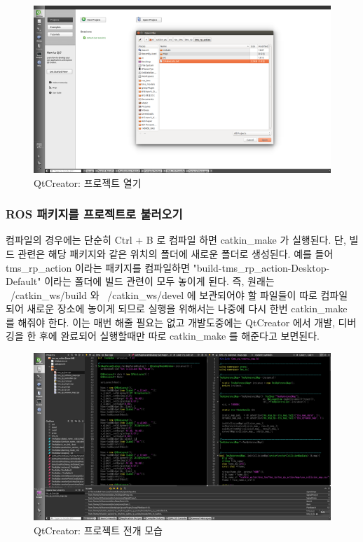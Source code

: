 \begin{figure}[h]
\centering\includegraphics[width=0.8\columnwidth]{pictures/chapter2/qtcreator2.png}
\caption{QtCreator: 프로젝트 열기}
\end{figure}

\subsubsection{ROS 패키지를 프로젝트로 불러오기}
컴파일의 경우에는 단순히 Ctrl + B 로 컴파일 하면 catkin\_make 가 실행된다. 단, 빌드 관련은 해당 패키지와 같은 위치의 폴더에 새로운 폴더로 생성된다. 예를 들어 tms\_rp\_action 이라는 패키지를 컴파일하면 "build-tms\_rp\_action-Desktop-Default" 이라는 폴더에 빌드 관련이 모두 놓이게 된다. 즉,  원래는 ~/catkin\_ws/build 와 ~/catkin\_ws/devel 에 보관되어야 할 파일들이 따로 컴파일 되어 새로운 장소에 놓이게 되므로 실행을 위해서는 나중에 다시 한번 catkin\_make 를 해줘야 한다. 이는 매번 해줄 필요는 없고 개발도중에는 QtCreator 에서 개발, 디버깅을 한 후에 완료되어 실행할때만 따로 catkin\_make 를 해준다고 보면된다. 

\begin{figure}[h]
\centering\includegraphics[width=0.8\columnwidth]{pictures/chapter2/qtcreator3.png}
\caption{QtCreator: 프로젝트 전개 모습}
\end{figure}

